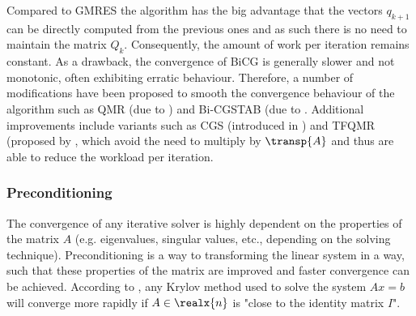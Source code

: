 Compared to GMRES the algorithm has the big advantage that the vectors $q_{k+1}$ can be directly computed from the previous ones and as such there is no need to maintain the matrix $Q_k$. Consequently, the amount of work per iteration remains constant. As a drawback, the convergence of BiCG is generally slower and not monotonic, often exhibiting erratic behaviour. Therefore, a number of modifications have been proposed to smooth the convergence behaviour of the algorithm such as QMR (due to \cite{freund_qmr_1991}) and Bi-CGSTAB (due to \cite{van_der_vorst_bi-cgstab_1992}. Additional improvements include variants such as CGS (introduced in \cite{sonneveld_cgs_1989}) and TFQMR (proposed by \cite{freund_transpose-free_1994}, which avoid the need to multiply by $\transp{A}$ and thus are able to reduce the workload per iteration.

\subsubsection{Preconditioning}
\label{sec:preconditioning}
The convergence of any iterative solver is highly dependent on the properties of the matrix $A$ (e.g. eigenvalues, singular values, etc., depending on the solving technique). Preconditioning is a way to transforming the linear system in a way, such that these properties of the matrix are improved and faster convergence can be achieved. According to \cite{golub_matrix_2013}, any Krylov method used to solve the system $Ax=b$ will converge more rapidly if $A \in \realx{n}$ is "close to the identity matrix $I$". 
